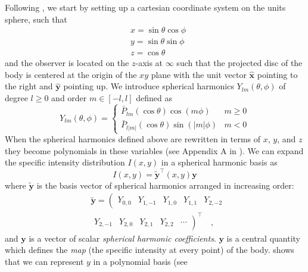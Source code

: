 \documentclass[12pt,dvipsnames]{report}
\begin{document}
Following \citet{2019AJ....157...64L}, we start by setting up a cartesian
coordinate system on the units sphere, such that
\begin{align}
     & x=\sin \theta \cos \phi \\
     & y=\sin \theta \sin \phi \\
     & z=\cos \theta
\end{align}
and the observer is located on the $z$-axis at $\infty$ such that the projected disc
of the body is centered at the origin of the $xy$ plane with the unit vector
$\hat{\mathbf{x}}$ pointing to the right and $\hat{\mathbf{y}}$ pointing up.
We introduce spherical harmonics $Y_{l m}(\theta, \phi)$ of degree $l\geq 0$ and order
$m\in [-l, l]$ defined  as
\begin{equation}
    Y_{l m}(\theta, \phi)= \begin{cases}\bar{P}_{l m}(\cos \theta) \cos (m \phi) & m \geqslant 0 \\ \bar{P}_{l|m|}(\cos \theta) \sin (|m| \phi) & m<0\end{cases}
    \label{eq:spherical_harmonics}
\end{equation}
When the spherical harmonics defined above are rewritten in terms of $x$, $y$, and $z$
they become polynomials in these variables (see Appendix A in \citet{2019AJ....157...64L}).
We can expand the specific intensity distribution $I(x,y)$ in a spherical harmonic basis
as
\begin{equation}
    I(x, y)=\tilde{\mathbf{y}}^{\intercal}(x, y) \mathbf{y}
    \label{eq:sh_expansion}
\end{equation}
where $\tilde{\mathbf{y}}$ is the basis vector of spherical harmonics  arranged in
increasing order:
\begin{align}
     & \tilde{\mathbf{y}}=\left(\begin{array}{lllll}
                                    Y_{0,0} & Y_{1,-1} & Y_{1,0} & Y_{1,1} & Y_{2,-2}
                                \end{array}\right. \\
     & \left.\begin{array}{lllll}
                 Y_{2,-1} & Y_{2,0} & Y_{2,1} & Y_{2,2} & \cdots
             \end{array}\right)^{\intercal} \quad,
\end{align}
and $\mathbf{y}$ is a vector of scalar \emph{spherical harmonic coefficients}.
$\mathbf{y}$ is a central quantity which defines the \emph{map} (the specific
intensity at every point) of the body.
\citet{2019AJ....157...64L} shows that we can represent $y$ in a polynomial basis (see
\end{document}
